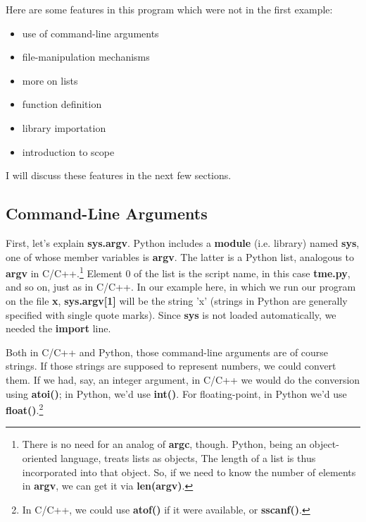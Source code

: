 Here are some features in this program which were not in the first
example:

\begin{itemize}

\item use of command-line arguments

\item file-manipulation mechanisms

\item more on lists

\item function definition

\item library importation 

\item introduction to scope 

\end{itemize}

I will discuss these features in the next few sections.

\subsection{Command-Line Arguments}

First, let's explain {\bf sys.argv}.  Python includes a {\bf module}
(i.e. library) named {\bf sys}, one of whose member variables is {\bf
argv}.  The latter is a Python list, analogous to {\bf argv} in
C/C++.\footnote{There is no need for an analog of {\bf argc}, though.
Python, being an object-oriented language, treats lists as objects, The
length of a list is thus incorporated into that object.  So, if we need
to know the number of elements in {\bf argv}, we can get it via {\bf
len(argv)}.} Element 0 of the list is the script name, in this case {\bf
tme.py}, and so on, just as in C/C++.  In our example here, in which we
run our program on the file {\bf x}, {\bf sys.argv[1]} will be the
string 'x' (strings in Python are generally specified with single quote
marks).  Since {\bf sys} is not loaded automatically, we needed the {\bf
import} line.

Both in C/C++ and Python, those command-line arguments are of course
strings.  If those strings are supposed to represent numbers, we could
convert them.  If we had, say, an integer argument, in C/C++ we would do
the conversion using {\bf atoi()}; in Python, we'd use {\bf int()}.  For
floating-point, in Python we'd use {\bf float()}.\footnote{In C/C++, we
could use {\bf atof()} if it were available, or {\bf sscanf()}.}

